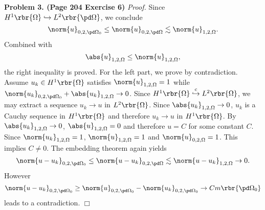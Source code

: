 \documentclass[english, nochinese]{pnote}
\begin{document}
\textbf{Problem 3. (Page 204 Exercise 6)} \textit{Proof.} Since $ H^1 \rbr{\Omega} \hookrightarrow L^2 \rbr{ \pd \Omega } $, we conclude
\begin{equation}
\norm{u}_{ 0, 2, \pd \Omega_0 } \le \norm{u}_{ 0, 2, \pd \Omega } \lesssim \norm{u}_{ 1, 2, \Omega }.
\end{equation}
Combined with
\begin{equation}
\abs{u}_{ 1, 2, \Omega } \le \norm{u}_{ 1, 2, \Omega },
\end{equation}
the right inequality is proved. For the left part, we prove by contradiction. Assume $ u_k \in H^1 \rbr{\Omega} $ satisfies $ \norm{u}_{ 1, 2, \Omega } = 1 $ while $ \norm{u_k}_{ 0, 2, \pd \Omega_0 } + \abs{u_k}_{ 1, 2, \Omega } \rightarrow 0 $. Since $ H^1 \rbr{\Omega} \stackrel{\text{c}}{\hookrightarrow} L^2 \rbr{\Omega} $, we may extract a sequence $ u_k \rightarrow u $ in $ L^2 \rbr{\Omega} $. Since $ \abs{u_k}_{ 1, 2, \Omega } \rightarrow 0 $, $u_k$ is a Cauchy sequence in $ H^1 \rbr{\Omega} $ and therefore $ u_k \rightarrow u $ in $ H^1 \rbr{\Omega} $. By $ \abs{u_k}_{ 1, 2, \Omega } \rightarrow 0 $, $ \abs{u}_{ 1, 2, \Omega } = 0 $ and therefore $ u = C $ for some constant $C$. Since $ \norm{u_k}_{ 1, 2, \Omega } = 1 $, $ \norm{u}_{ 1, 2, \Omega } = 1 $ and $ \norm{u}_{ 0, 2, \Omega } = 1 $. This implies $ C \neq 0 $. The embedding theorem again yields
\begin{equation}
\norm{ u - u_k }_{ 0, 2, \pd \Omega_0 } \le \norm{ u - u_k }_{ 0, 2, \pd \Omega } \lesssim \norm{ u - u_k }_{ 1, 2, \Omega } \rightarrow 0.
\end{equation}
However
\begin{equation}
\norm{ u - u_k }_{ 0, 2, \pd \Omega_0 } \ge \norm{u}_{ 0, 2, \pd \Omega_0 } - \norm{u_k}_{ 0, 2, \pd \Omega_0 } \rightarrow C m \rbr{ \pd \Omega_0 }
\end{equation}
leads to a contradiction.
\hfill$\Box$
\end{document}
